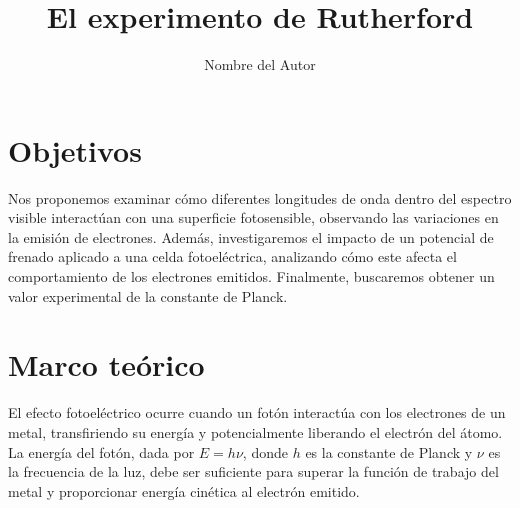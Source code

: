 \documentclass[twocolumn,a4paper,11pt]{scrartcl}
\title{El experimento de Rutherford}
\author{Nombre del Autor}
\date{}
\begin{document}

\section{Objetivos}
Nos proponemos examinar cómo diferentes longitudes de onda dentro del espectro visible interactúan con una superficie fotosensible, observando las variaciones en la emisión de electrones. Además, investigaremos el impacto de un potencial de frenado aplicado a una celda fotoeléctrica, analizando cómo este afecta el comportamiento de los electrones emitidos. Finalmente, buscaremos obtener un valor experimental de la constante de Planck.

\section{Marco teórico}

El efecto fotoeléctrico ocurre cuando un fotón interactúa con los electrones de un metal, transfiriendo su energía y potencialmente liberando el electrón del átomo. La energía del fotón, dada por $E = h\nu$, donde $h$ es la constante de Planck y $\nu$ es la frecuencia de la luz, debe ser suficiente para superar la función de trabajo del metal y proporcionar energía cinética al electrón emitido.
\end{document}
